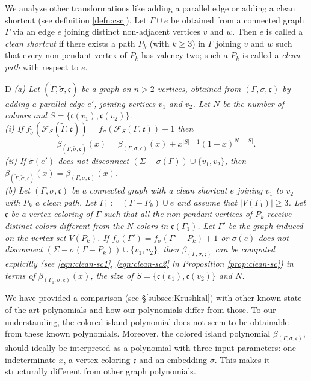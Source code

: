 \documentclass[10pt, reqno]{amsart}
\newcommand{\hf}{\hspace*{0.5cm}}
\theoremstyle{plain}
\theoremstyle{remark}
\theoremstyle{definition}
\numberwithin{equation}{section}
\begin{document}
We analyze other transformations like adding a parallel edge or adding a clean shortcut (see definition \ref{defn:csc}). Let $\Gamma\cup e$ be obtained from a connected graph $\Gamma$ via an edge $e$ joining distinct non-adjacent vertices $v$ and $w$. Then $e$ is called a {\it clean shortcut} if there exists a path $P_k$ (with $k\geq 3$) in $\Gamma$ joining $v$ and $w$ such that every non-pendant vertex of $P_k$ has valency two; such a $P_k$ is called a {\it clean path} with respect to $e$.
\begin{customthm}{D}
{\it \textup{(a)} Let $(\tilde{\Gamma},\tilde{\sigma},\mathfrak{c})$ be a graph on $n>2$ vertices, obtained from $(\Gamma,\sigma,\mathfrak{c})$ by adding a parallel edge $e'$, joining vertices $v_1$ and $v_2$. Let $N$ be the number of colours and $S=\{\mathfrak{c}(v_1),\mathfrak{c}(v_2)\}$. \\
\textup{(i)} If $f_{\tilde{\sigma}}(\mathscr{F}_S(\tilde{\Gamma},\mathfrak{c}))=f_{\sigma}(\mathscr{F}_S(\Gamma,\mathfrak{c}))+1$ then
\begin{equation*}
\beta_{(\tilde{\Gamma},\tilde{\sigma},\mathfrak{c})}(x)=\beta_{(\Gamma,\sigma,\mathfrak{c})}(x)+x^{|S|-1}(1+x)^{N-|S|}.
\end{equation*}
\textup{(ii)} If $\tilde{\sigma}(e')$ does not disconnect $(\Sigma-\sigma(\Gamma))\cup\{v_1,v_2\}$, then ${\beta}_{(\tilde{\Gamma},\tilde{\sigma},\mathfrak{c})}(x)={\beta}_{(\Gamma,\sigma,\mathfrak{c})}(x)$. \\
\textup{(b)} Let $(\Gamma,\sigma,\mathfrak{c})$ be a connected graph with a clean shortcut $e$ joining $v_1$ to $v_2$ with $P_k$ a clean path. Let $\Gamma_1:=(\Gamma-P_k)\cup e$ and assume that $|V(\Gamma_1)|\geq 3$. Let $\mathfrak{c}$ be a vertex-coloring of $\Gamma$ such that all the non-pendant vertices of $P_k$ receive distinct colors different from the $N$ colors in $\mathfrak{c}(\Gamma_1)$. Let $\Gamma'$ be the graph induced on the vertex set $V(P_k)$. If $f_{\sigma}(\Gamma')=f_{\sigma}(\Gamma'-P_k)+1$ or $\sigma(e)$ does not disconnect $(\Sigma-\sigma(\Gamma-P_k))\cup\{v_1,v_2\}$, then $\beta_{(\Gamma,\sigma,\mathfrak{c})}$ can be computed explicitly (see \eqref{eqn:clean-sc1}, \eqref{eqn:clean-sc2} in Proposition \ref{prop:clean-sc}) in terms of $\beta_{(\Gamma_1,\sigma,\mathfrak{c})}(x)$, the size of $S=\{\mathfrak{c}(v_1),\mathfrak{c}(v_2)\}$ and $N$.}
\end{customthm}
\hf We have provided a comparison (see \S \ref{subsec:Krushkal}) with other known state-of-the-art polynomials and how our polynomials differ from those. To our understanding, the colored island polynomial does not seem to be obtainable from these known polynomials. Moreover, the colored island polynomial $\beta_{(\Gamma,\sigma,\mathfrak{c})}$, should ideally be interpreted as a polynomial with three input parameters: one indeterminate $x$, a vertex-coloring $\mathfrak{c}$ and an embedding $\sigma$. This makes it structurally different from other graph polynomials. \\
\end{document}
